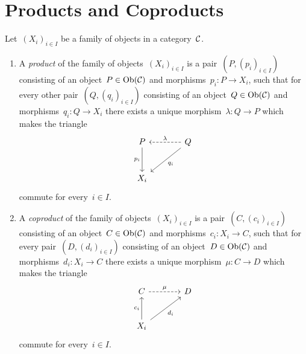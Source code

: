 \section{Products and Coproducts}

\begin{definition}
  Let~$(X_i)_{i \in I}$ be a family of objects in a category~$\mathcal{C}$.
  \begin{enumerate}
    \item
      A \emph{product} of the family of objects~$(X_i)_{i \in I}$ is a pair~$(P, (p_i)_{i \in I})$ consisting of an object~$P \in \operatorname{Ob}(\mathcal{C})$ and morphisms~$p_i \colon P \to X_i$, such that for every other pair~$(Q, (q_i)_{i \in I})$ consisting of an object~$Q \in \operatorname{Ob}(\mathcal{C})$ and morphisms~$q_i \colon Q \to X_i$ there exists a unique morphism~$\lambda \colon Q \to P$ which makes the triangle
      \[
        \begin{tikzcd}[sep = large]
            P
            \arrow{d}[left]{p_i}
          & Q
            \arrow{dl}[below right]{q_i}
            \arrow[dashed]{l}[above]{\lambda}
          \\
            X_i
          & {}
        \end{tikzcd}
      \]
      commute for every~$i \in I$.
    \item
      A \emph{coproduct} of the family of objects~$(X_i)_{i \in I}$ is a pair~$(C, (c_i)_{i \in I})$ consisting of an object~$C \in \operatorname{Ob}(\mathcal{C})$ and morphisms~$c_i \colon X_i \to C$, such that for every pair~$(D, (d_i)_{i \in I})$ consisting of an object~$D \in \operatorname{Ob}(\mathcal{C})$ and morphisms~$d_i \colon X_i \to C$ there exists a unique morphism~$\mu \colon C \to D$ which makes the triangle
      \[
        \begin{tikzcd}[sep = large]
            C
            \arrow[dashed]{r}[above]{\mu}
          & D
          \\
            X_i
            \arrow{u}[left]{c_i}
            \arrow{ur}[below right]{d_i}
          & {}
        \end{tikzcd}
      \]
      commute for every~$i \in I$.
  \end{enumerate}
\end{definition}


